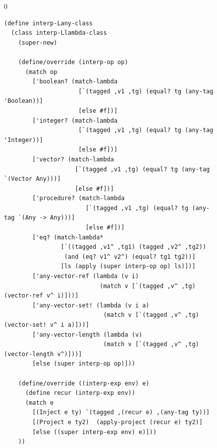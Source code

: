 \documentclass[7x10]{TimesAPriori_MIT}%
\def\racketEd{0}
\def\edition{1}
\numberwithin{theorem}{chapter}
\numberwithin{definition}{chapter}
\numberwithin{equation}{chapter}
\begin{document}
\begin{figure}[btp]
  \begin{tcolorbox}[colback=white]
{\if\edition\racketEd
\begin{lstlisting}[basicstyle=\ttfamily\footnotesize]
(define interp-Lany-class
  (class interp-Llambda-class
    (super-new)

    (define/override (interp-op op)
      (match op
        ['boolean? (match-lambda
                     [`(tagged ,v1 ,tg) (equal? tg (any-tag 'Boolean))]
                     [else #f])]
        ['integer? (match-lambda
                     [`(tagged ,v1 ,tg) (equal? tg (any-tag 'Integer))]
                     [else #f])]
        ['vector? (match-lambda
                    [`(tagged ,v1 ,tg) (equal? tg (any-tag `(Vector Any)))]
                    [else #f])]
        ['procedure? (match-lambda
                       [`(tagged ,v1 ,tg) (equal? tg (any-tag `(Any -> Any)))]
                       [else #f])]
        ['eq? (match-lambda*
                [`((tagged ,v1^ ,tg1) (tagged ,v2^ ,tg2))
                 (and (eq? v1^ v2^) (equal? tg1 tg2))]
                [ls (apply (super interp-op op) ls)])]
        ['any-vector-ref (lambda (v i)
                           (match v [`(tagged ,v^ ,tg) (vector-ref v^ i)]))]
        ['any-vector-set! (lambda (v i a)
                            (match v [`(tagged ,v^ ,tg) (vector-set! v^ i a)]))]
        ['any-vector-length (lambda (v)
                            (match v [`(tagged ,v^ ,tg) (vector-length v^)]))]
        [else (super interp-op op)]))

    (define/override ((interp-exp env) e)
      (define recur (interp-exp env))
      (match e
        [(Inject e ty) `(tagged ,(recur e) ,(any-tag ty))]
        [(Project e ty2)  (apply-project (recur e) ty2)]
        [else ((super interp-exp env) e)]))
    ))


\end{lstlisting}}
\end{tcolorbox}
\end{figure}
\end{document}
